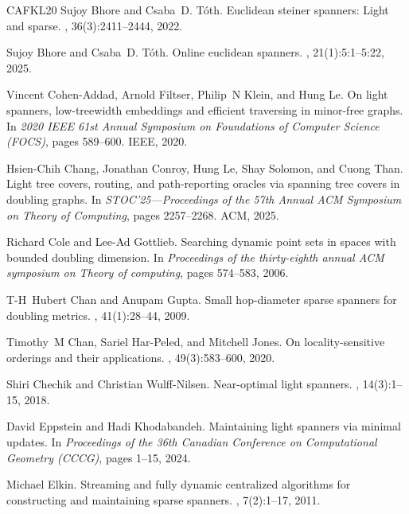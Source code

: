 \documentclass[11pt]{article}
\begin{document}
\begin{thebibliography}{CAFKL20}
Sujoy Bhore and Csaba~D. T{\'{o}}th.
\newblock Euclidean steiner spanners: Light and sparse.
, 36(3):2411--2444, 2022.

Sujoy Bhore and Csaba~D. T{\'{o}}th.
\newblock Online euclidean spanners.
, 21(1):5:1--5:22, 2025.

Vincent Cohen-Addad, Arnold Filtser, Philip~N Klein, and Hung Le.
\newblock On light spanners, low-treewidth embeddings and efficient traversing
  in minor-free graphs.
\newblock In {\em 2020 IEEE 61st Annual Symposium on Foundations of Computer
  Science (FOCS)}, pages 589--600. IEEE, 2020.

Hsien-Chih Chang, Jonathan Conroy, Hung Le, Shay Solomon, and Cuong Than.
\newblock Light tree covers, routing, and path-reporting oracles via spanning
  tree covers in doubling graphs.
\newblock In {\em S{TOC}'25---{P}roceedings of the 57th {A}nnual {ACM}
  {S}ymposium on {T}heory of {C}omputing}, pages 2257--2268. ACM, 2025.

Richard Cole and Lee-Ad Gottlieb.
\newblock Searching dynamic point sets in spaces with bounded doubling
  dimension.
\newblock In {\em Proceedings of the thirty-eighth annual ACM symposium on
  Theory of computing}, pages 574--583, 2006.

T-H~Hubert Chan and Anupam Gupta.
\newblock Small hop-diameter sparse spanners for doubling metrics.
, 41(1):28--44, 2009.

Timothy~M Chan, Sariel {Har-Peled}, and Mitchell Jones.
\newblock On locality-sensitive orderings and their applications.
, 49(3):583--600, 2020.

Shiri Chechik and Christian {Wulff-Nilsen}.
\newblock Near-optimal light spanners.
, 14(3):1--15, 2018.

David Eppstein and Hadi Khodabandeh.
\newblock Maintaining light spanners via minimal updates.
\newblock In {\em Proceedings of the 36th Canadian Conference on Computational
  Geometry (CCCG)}, pages 1--15, 2024.

Michael Elkin.
\newblock Streaming and fully dynamic centralized algorithms for constructing
  and maintaining sparse spanners.
, 7(2):1--17, 2011.


\end{thebibliography}
\end{document}

